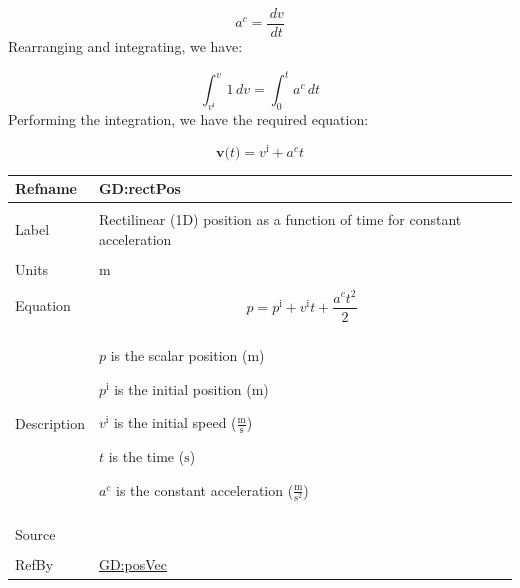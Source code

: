 \documentclass[12pt]{article}
\begin{document}
\begin{displaymath}
{a^{c}}=\frac{\,dv}{\,dt}
\end{displaymath}
Rearranging and integrating, we have:

\begin{displaymath}
\int_{{v^{\text{i}}}}^{v}{1}\,dv=\int_{0}^{t}{{a^{c}}}\,dt
\end{displaymath}
Performing the integration, we have the required equation:

\begin{displaymath}
\symbf{v}\text{(}t\text{)}={v^{\text{i}}}+{a^{c}} t
\end{displaymath}
\vspace{\baselineskip}
\noindent
\begin{minipage}{\textwidth}
\begin{tabular}{>{\raggedright}p{}>{\raggedright\arraybackslash}p{}}
\toprule \textbf{Refname} & \textbf{GD:rectPos}
\label{GD:rectPos}
\\ \midrule \\
Label & Rectilinear (1D) position as a function of time for constant acceleration
        
\\ \midrule \\
Units & ${\text{m}}$
        
\\ \midrule \\
Equation & \begin{displaymath}
           p={p^{\text{i}}}+{v^{\text{i}}} t+\frac{{a^{c}} t^{2}}{2}
           \end{displaymath}
\\ \midrule \\
Description & \begin{symbDescription}
              \item{$p$ is the scalar position (${\text{m}}$)}
              \item{${p^{\text{i}}}$ is the initial position (${\text{m}}$)}
              \item{${v^{\text{i}}}$ is the initial speed ($\frac{\text{m}}{\text{s}}$)}
              \item{$t$ is the time (${\text{s}}$)}
              \item{${a^{c}}$ is the constant acceleration ($\frac{\text{m}}{\text{s}^{2}}$)}
              \end{symbDescription}
\\ \midrule \\
Source & \cite[(pg. 8)]{hibbeler2004}
         
\\ \midrule \\
RefBy & \hyperref[GD:posVec]{GD:posVec}
        
\\ \bottomrule
\end{tabular}
\end{minipage}
\end{document}
